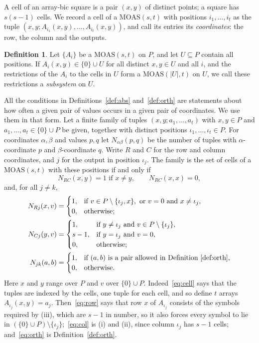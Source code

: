 \documentclass[11pt]{amsart}
\theoremstyle{definition}\newtheorem{definition}[theorem]{Definition}
\theoremstyle{remark}\newtheorem{remark}[theorem]{Remark}
\newcommand{\MOAS}{\mathrm{MOAS}}
\begin{document}
A cell of an array-bic square is a pair $(x,y)$ of distinct points; a square has $s(s-1)$ cells. We record a cell of
a $\MOAS(s,t)$ with positions $i_1,\dots,i_t$ as the tuple $(x,y;A_{i_1}(x,y),\dots,A_{i_t}(x,y))$, and call its
entries its \emph{coordinates}: the row, the column and the outputs.

\begin{definition}\label{def:sub}
Let $\{A_i\}$ be a $\MOAS(s,t)$ on $P$, and let $U\subseteq P$ contain all positions. If $A_i(x,y)\in\{0\}\cup U$
for all distinct $x,y\in U$ and all $i$, and the restrictions of the $A_i$ to the cells in $U$ form a $\MOAS(|U|,t)$ on
$U$, we call these restrictions a \emph{subsystem} on $U$.
\end{definition}

All the conditions in Definitions~\ref{def:abs} and~\ref{def:orth} are statements about how often a given pair of values
occurs in a given pair of coordinates. We use them in that form. Let a finite family of tuples
$(x,y;a_1,\dots,a_t)$ with $x,y\in P$ and $a_1,\dots,a_t\in\{0\}\cup P$ be given, together with distinct positions
$\iota_1,\dots,\iota_t\in P$. For coordinates $\alpha,\beta$ and values $p,q$ let $N_{\alpha\beta}(p,q)$ be the number
of tuples with $\alpha$-coordinate $p$ and $\beta$-coordinate $q$. Write $R$ and $C$ for the row and column
coordinates, and $j$ for the output in position $\iota_j$. The family is the set of cells of a $\MOAS(s,t)$ with
these positions if and only if
\begin{equation}\label{eq:cell}
N_{RC}(x,y)=1 \text{ if } x\ne y,\qquad N_{RC}(x,x)=0,
\end{equation}
and, for all $j\ne k$,
\begin{align}
N_{Rj}(x,v)&=\begin{cases}1,& \text{if } v\in P\setminus\{\iota_j,x\}, \text{ or } v=0 \text{ and } x\ne\iota_j,\\
0,&\text{otherwise};\end{cases}\label{eq:row}\\
N_{Cj}(y,v)&=\begin{cases}1,& \text{if } y\ne \iota_j \text{ and } v\in P\setminus\{\iota_j\},\\
s-1,& \text{if } y=\iota_j \text{ and } v=0,\\ 0,&\text{otherwise};\end{cases}\label{eq:col}\\
N_{jk}(a,b)&=\begin{cases}1,& \text{if $(a,b)$ is a pair allowed in Definition~\ref{def:orth}},\\
0,&\text{otherwise}.\end{cases}\label{eq:orth}
\end{align}
Here $x$ and $y$ range over $P$ and $v$ over $\{0\}\cup P$. Indeed~\eqref{eq:cell} says that the tuples are indexed by
the cells, one tuple for each cell, and so define $t$ arrays $A_{\iota_j}(x,y)=a_j$. Then~\eqref{eq:row} says that row $x$ of $A_{\iota_j}$ consists of the symbols required by (iii), which are $s-1$ in
number, so it also forces every symbol to lie in $(\{0\}\cup P)\setminus\{\iota_j\}$;~\eqref{eq:col} is (i) and (ii),
since column $\iota_j$ has $s-1$ cells; and~\eqref{eq:orth} is Definition~\ref{def:orth}.
\end{document}
